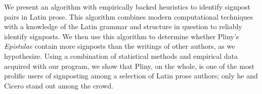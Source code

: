 We present an algorithm with empirically backed heuristics to identify signpost pairs in Latin prose. This algorithm combines modern computational techniques with a knowledge of the Latin grammar and structure in question to reliably identify signposts. We then use this algorithm to determine whether Pliny's \textit{Epistulae} contain more signposts than the writings of other authors, as we hypothesize. Using a combination of statistical methods and empirical data acquired with our program, we show that Pliny, on the whole, is one of the most prolific users of signposting among a selection of Latin prose authors; only he and Cicero stand out among the crowd.
